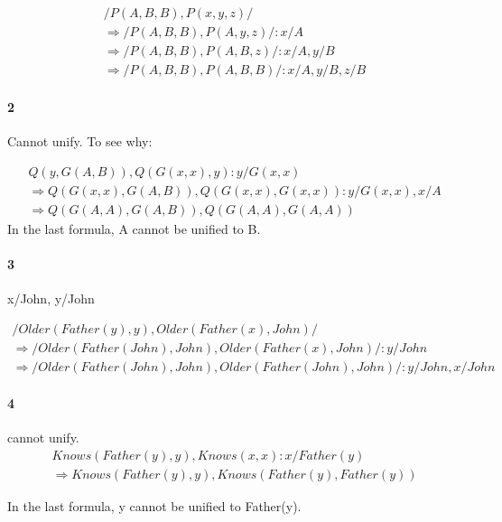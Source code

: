\begin{eqnarray}
    /P(A,B,B), P(x,y,z)/\\
    \Rightarrow /P(A,B,B), P(A,y,z)/ : {x/A}\\
    \Rightarrow /P(A,B,B), P(A,B,z)/ : {x/A, y/B}\\
    \Rightarrow /P(A,B,B), P(A,B,B)/ : {x/A, y/B, z/B}
\end{eqnarray}

\paragraph{2}
Cannot unify.
To see why:

\begin{eqnarray}
    Q(y,G(A,B)),Q(G(x,x),y) : {y/G(x,x)}\\
    \Rightarrow Q(G(x,x), G(A,B)), Q(G(x,x), G(x,x)) : {y/G(x,x), x/A}\\
    \Rightarrow Q(G(A,A), G(A,B)), Q(G(A,A), G(A,A))
\end{eqnarray}
In the last formula, A cannot be unified to B.

\paragraph{3}
{x/John, y/John}

\begin{eqnarray}
  /Older(Father(y),y),Older(Father(x),John)/\\
  \Rightarrow /Older(Father(John),John),Older(Father(x),John)/ : {y/John}\\
  \Rightarrow /Older(Father(John),John),Older(Father(John),John)/ : {y/John, x/John}
\end{eqnarray}

\paragraph{4}
cannot unify.
\begin{eqnarray}
  Knows(Father(y),y), Knows(x,x) : {x/Father(y)}\\
  \Rightarrow Knows(Father(y),y), Knows(Father(y),Father(y))
\end{eqnarray}

In the last formula, y cannot be unified to Father(y).

